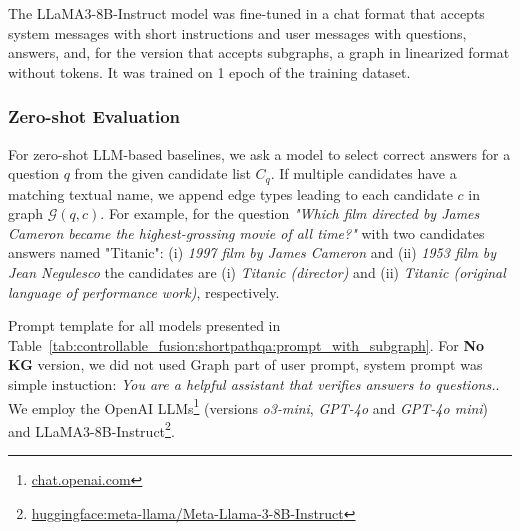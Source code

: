The LLaMA3-8B-Instruct model was fine-tuned in a chat format that accepts system messages with short instructions and user messages with questions, answers, and, for the version that accepts subgraphs, a graph in linearized format without tokens. It was trained on 1 epoch of the training dataset. 

\subsubsection{Zero-shot Evaluation}

For zero-shot LLM-based baselines, we ask a model to select correct answers for a question $q$ from the given candidate list $C_q$. If multiple candidates have a matching textual name, we append edge types leading to each candidate $c$ in graph $\mathcal{G}(q, c)$. For example, for the question \textit{"Which film directed by James Cameron became the highest-grossing movie of all time?"} with two candidates answers named "Titanic": (i) \textit{1997 film by James Cameron} and (ii) \textit{1953 film by Jean Negulesco} the candidates are (i) \textit{Titanic (director)} and (ii) \textit{Titanic (original language of performance work)}, respectively. 

Prompt template for all models presented in Table~\ref{tab:controllable_fusion:shortpathqa:prompt_with_subgraph}. For \textbf{No KG} version, we did not used Graph part of user prompt, system prompt was simple instuction: \textit{You are a helpful assistant that verifies answers to questions.}. We employ the OpenAI LLMs\footnote{\href{https://chat.openai.com}{chat.openai.com}} (versions \textit{o3-mini}, \textit{GPT-4o} and \textit{GPT-4o mini}) and LLaMA3-8B-Instruct\footnote{\href{https://huggingface.co/meta-llama/Meta-Llama-3-8B-Instruct}{huggingface:meta-llama/Meta-Llama-3-8B-Instruct}}.

